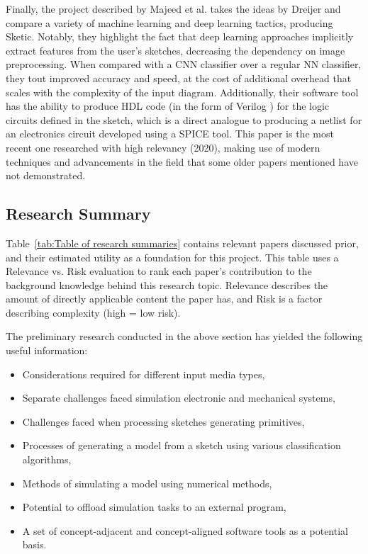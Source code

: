 \documentclass[11pt]{article}
\begin{document}
Finally, the project described by Majeed et al. \cite{191016} takes the ideas by Dreijer and compare a variety of machine learning and deep
learning tactics, producing Sketic. Notably, they highlight the fact that deep learning approaches implicitly extract features from the user's
sketches, decreasing the dependency on image preprocessing. When compared with a \gls{CNN} classifier over a regular \gls{NN} classifier, they
tout improved accuracy and speed, at the cost of additional overhead that scales with the complexity of the input diagram. Additionally,
their software tool has the ability to produce \gls{HDL} code (in the form of Verilog \cite{8299595}) for the logic circuits defined in the sketch, which is a direct analogue to
producing a netlist for an electronics circuit developed using a \gls{SPICE} tool. This paper is the most recent
one researched with high relevancy (2020), making use of modern techniques and advancements in the field that some older papers mentioned have not demonstrated.

\subsection{Research Summary}
\label{subsec:Research Summary}

Table~\ref{tab:Table of research summaries} contains relevant papers discussed prior, and their estimated utility as a foundation for this project.
This table uses a Relevance vs. Risk evaluation to rank each paper's contribution to the background knowledge behind this research
topic. Relevance describes the amount of directly applicable content the paper has, and Risk is a factor describing complexity
(high = low risk).

The preliminary research conducted in the above section has yielded the following useful information:

\begin{itemize}
    \item Considerations required for different input media types,
    \item Separate challenges faced simulation electronic and mechanical systems,
    \item Challenges faced when processing sketches generating primitives,
    \item Processes of generating a model from a sketch using various classification algorithms,
    \item Methods of simulating a model using numerical methods,
    \item Potential to offload simulation tasks to an external program,
    \item A set of concept-adjacent and concept-aligned software tools as a potential basis.
\end{itemize}
\end{document}
